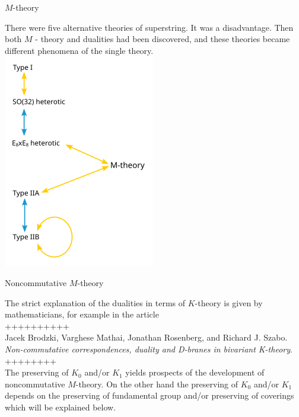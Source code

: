 \documentclass{beamer}
\theoremstyle{plain}
\newtheorem{empt}{}
\begin{document}
\begin{frame}
\begin{center}
\huge{$M$-theory} 
\end{center}
There were five alternative theories  of \alert{superstring}. It was a disadvantage. Then both \alert{$M$ - theory} and \alert{dualities} had been discovered, and these theories became different phenomena of the single theory.
\includegraphics[scale=0.4]{StringTheoryDualities.png}
\end{frame}
\begin{frame}
	\begin{center}
	\centering	\huge{Noncommutative $M$-theory}
	\end{center}
	The strict explanation of the \alert{dualities} in terms of $K$-theory is given by mathematicians, for example in the  article \\
++++++++++\\	
	Jacek Brodzki, Varghese Mathai, Jonathan Rosenberg, and
	Richard J. Szabo.
\textit{Non-commutative
correspondences, duality and
D-branes in bivariant K-theory}.
\\++++++++\\
The preserving of $K_0$ and/or $K_1$ yields prospects of  the development of \alert{noncommutative $M$-theory}.
On the other hand the preserving of $K_0$ and/or $K_1$ depends on the \alert{preserving of fundamental group} and/or \alert{preserving of coverings} which will be explained below.
\end{frame}
\end{document}
